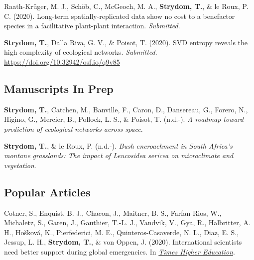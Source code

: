 \documentclass[11pt, a4paper]{awesome-cv}
\begin{document}
\begingroup
\setlength{\parindent}{-0.5in}
\setlength{\leftskip}{0.5in}

\hypertarget{refs_review}{}
\leavevmode\hypertarget{ref-Long-termMJRK}{}%
Raath-Krüger, M. J., Schöb, C., McGeoch, M. A., \textbf{Strydom, T.}, \& le Roux, P. C. (2020). Long-term spatially-replicated data show no cost to a benefactor species in a facilitative plant-plant interaction. \emph{Submitted}.

\leavevmode\hypertarget{ref-StrydomSVDEnt2020}{}%
\textbf{Strydom, T.}, Dalla Riva, G. V., \& Poisot, T. (2020). SVD entropy reveals the high complexity of ecological networks. \emph{Submitted}. \url{https://doi.org/10.32942/osf.io/q9v85}

\endgroup
\vspace{\baselineskip}

\hypertarget{manuscripts-in-prep}{%
\subsection{\texorpdfstring{\textbf{Manuscripts In Prep}}{Manuscripts In Prep}}\label{manuscripts-in-prep}}

\begingroup
\setlength{\parindent}{-0.5in}
\setlength{\leftskip}{0.5in}

\hypertarget{refs_prep}{}
\leavevmode\hypertarget{ref-StrydomNetPre2020}{}%
\textbf{Strydom, T.}, Catchen, M., Banville, F., Caron, D., Dansereau, G., Forero, N., Higino, G., Mercier, B., Pollock, L. S., \& Poisot, T. (n.d.-). \emph{A roadmap toward prediction of ecological networks across space}.

\leavevmode\hypertarget{ref-Strydom2020Hons}{}%
\textbf{Strydom, T.}, \& le Roux, P. (n.d.-). \emph{Bush encroachment in South Africa's montane grasslands: The impact of \textup{Leucosidea sericea} on microclimate and vegetation}.

\endgroup
\vspace{\baselineskip}

\hypertarget{popular-articles}{%
\subsection{\texorpdfstring{\textbf{Popular Articles}}{Popular Articles}}\label{popular-articles}}

\begingroup
\setlength{\parindent}{-0.5in}
\setlength{\leftskip}{0.5in}

\hypertarget{refs_popular}{}
\leavevmode\hypertarget{ref-peru2020}{}%
Cotner, S., Enquist, B. J., Chacon, J., Maitner, B. S., Farfan-Rios, W., Michaletz, S., Garen, J., Gauthier, T.-L. J., Vandvik, V., Gya, R., Halbritter, A. H., Hošková, K., Pierfederici, M. E., Quinteros-Casaverde, N. L., Diaz, E. S., Jessup, L. H., \textbf{Strydom, T.}, \& von Oppen, J. (2020). International scientists need better support during global emergencies. In \emph{\href{https://tinyurl.com/y5ccw9nb}{Times Higher Education}}.
\end{document}
